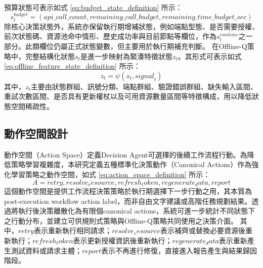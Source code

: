 \begin{ZhChapter}
\text 預算狀態可表示如式 \eqref{eq:budget_state_definition} 所示：
\begin{equation}
\label{eq:budget_state_definition}
s_t^{budget}=
(
api\_call\_count,
remaining\_call\_budget,
remaining\_time\_budget\_sec
)
\end{equation}
\text 除核心決策狀態外，系統亦保留執行期增補狀態，例如端點型態、是否需要授權、前次狀態碼、資源池命中情形、歷史成功率與目前節點等欄位，作為$s_t^{runtime}$之一部分。此類欄位仍屬正式狀態變數，但主要用於執行期補充判斷。
\text 在Offline-Q策略中，完整結構化狀態$s_t$是進一步映射為緊湊特徵狀態$z_t$。其形式可表示如式 \eqref{eq:offline_feature_state_definition} 所示：
\begin{equation}
\label{eq:offline_feature_state_definition}
z_t=\psi(s_t,\textit{signal}_t)
\end{equation}
\text 其中，$z_t$主要由狀態群組、訊號分類、端點群組、驗證錯誤群組、缺失輸入區間、重試次數區間、是否具有更新權杖以及可用資源數量區間等特徵構成，用以降低狀態空間稀疏性。

\subsection{動作空間設計}
\text 動作空間（Action Space）定義Decision Agent可選擇的後續工作流程行動。為降低策略學習複雜度，本研究定義五種標準化決策動作（Canonical Actions）作為強化學習策略之動作空間，如式 \eqref{eq:action_space_definition} 所示：
\begin{equation}
\label{eq:action_space_definition}
A=
{
retry,
resolve_resource,
refresh_token,
regenerate_data,
report
}
\end{equation}
\text 這個動作空間是提供工作流程決策策略於執行期選擇下一步行動之用，其本質為post-execution workflow action label，而非自由文字建議或高階任務規劃結果。透過將執行後決策離散化為有限個canonical actions，系統可進一步統計不同狀態下之行動分布，並建立可供規則式策略與Offline-Q策略共同使用之決策介面。
\text 其中，$retry$表示重新執行相同請求；$resolve_resource$表示補齊或替換必要資源後重新執行；$refresh_token$表示更新授權資訊後重新執行；$regenerate_data$表示重新產生測試資料或請求主體；$report$表示不再進行修復，直接進入報告產生與結果歸因階段。


\end{ZhChapter}
